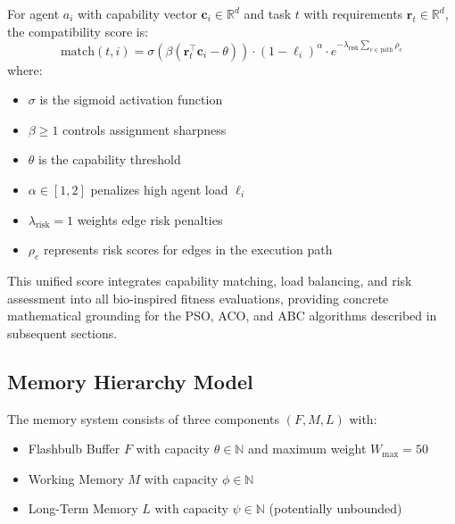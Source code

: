 \documentclass{article}
\begin{document}
\begin{definition}
\label{def:match_score}
For agent $a_i$ with capability vector $\mathbf{c}_i \in \mathbb{R}^d$ and task $t$ with requirements $\mathbf{r}_t \in \mathbb{R}^d$, the compatibility score is:
\begin{equation}
\label{eq:match_score}
\text{match}(t,i) = \sigma\left(\beta(\mathbf{r}_t^\top \mathbf{c}_i - \theta)\right) \cdot (1-\ell_i)^\alpha \cdot e^{-\lambda_{\text{risk}} \sum_{e \in \text{path}} \rho_e}
\end{equation}
where:
\begin{itemize}
\item $\sigma$ is the sigmoid activation function
\item $\beta \geq 1$ controls assignment sharpness  
\item $\theta$ is the capability threshold
\item $\alpha \in [1,2]$ penalizes high agent load $\ell_i$
\item $\lambda_{\text{risk}} = 1$ weights edge risk penalties
\item $\rho_e$ represents risk scores for edges in the execution path
\end{itemize}
\end{definition}

This unified score integrates capability matching, load balancing, and risk assessment into all bio-inspired fitness evaluations, providing concrete mathematical grounding for the PSO, ACO, and ABC algorithms described in subsequent sections.

\subsection{Memory Hierarchy Model}

\begin{definition}
The memory system consists of three components $(F, M, L)$ with:
\begin{itemize}
\item Flashbulb Buffer $F$ with capacity $\theta \in \mathbb{N}$ and maximum weight $W_{\max} = 50$
\item Working Memory $M$ with capacity $\phi \in \mathbb{N}$  
\item Long-Term Memory $L$ with capacity $\psi \in \mathbb{N}$ (potentially unbounded)
\end{itemize}
\end{definition}
\end{document}
